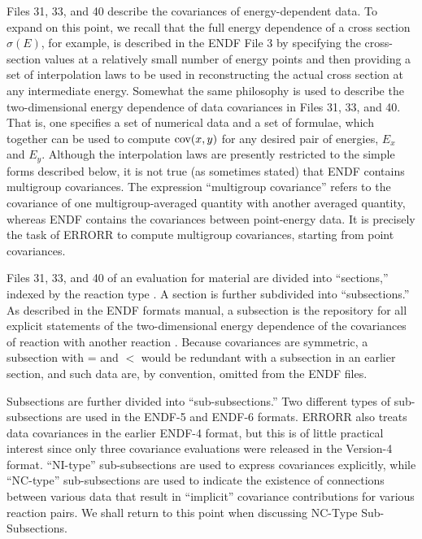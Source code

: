 Files 31, 33, and 40 describe the covariances of energy-dependent data.  To
expand on this point, we recall that the full energy dependence of a
cross section $\sigma (E)$, for example, is described in the ENDF File
3 by specifying the cross-section values at a relatively small number
of energy points and then providing a set of interpolation laws to be
used in reconstructing the actual cross section at any intermediate
energy.  Somewhat the same philosophy is used to describe the
two-dimensional energy dependence of data covariances in Files 31, 33, and
40.  That is, one specifies a set of numerical data and a set of
formulae, which together can be used to compute ${\rm cov}(x,y)$ for
any desired pair of energies, $E_x$ and $E_y$.  Although
the interpolation laws are presently restricted to the simple forms
described below, it is not true (as sometimes stated) that ENDF
contains multigroup covariances.  The expression ``multigroup
covariance'' refers to the covariance of one multigroup-averaged
quantity with another averaged quantity, whereas ENDF contains the
covariances between point-energy data.  It is precisely the task of
ERRORR to compute multigroup covariances, starting from point
covariances.

Files 31, 33, and 40 of an evaluation for material  are divided
into ``sections,'' indexed by the reaction type .  A section
 is further subdivided into ``subsections.''  As
described in the ENDF formats manual, a subsection is the repository
for all explicit statements of the two-dimensional energy dependence
of the covariances of reaction  with another reaction
.  Because covariances are symmetric, a subsection
with = and $<$ would be
redundant with a subsection in an earlier section, and such data are,
by convention, omitted from the ENDF files.

Subsections are further divided into ``sub-subsections.''  Two different
types of sub-subsections are used in the ENDF-5 and ENDF-6 formats.  ERRORR
also treats data covariances in the earlier
ENDF-4 format, but this is of little practical interest since only three
covariance evaluations were released in the Version-4 format.  ``NI-type''
sub-subsections are used to express covariances explicitly, while
``NC-type'' sub-subsections are used to indicate the existence of
connections between various data that result in ``implicit'' covariance
contributions for various reaction pairs.  We shall return to this
point when discussing NC-Type Sub-Subsections.

